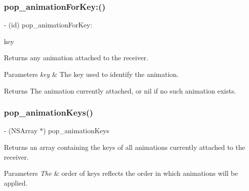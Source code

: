 \subsubsection{\texorpdfstring{pop\+\_\+animation\+For\+Key\+:()}{pop\_animationForKey:()}\hspace{0.1cm}{\footnotesize\ttfamily [3/3]}}
{\footnotesize\ttfamily -\/ (id) pop\+\_\+animation\+For\+Key\+: \begin{DoxyParamCaption}\item[{(N\+S\+String $\ast$)}]{key }\end{DoxyParamCaption}}

Returns any animation attached to the receiver. 
\begin{DoxyParams}{Parameters}
{\em key} & The key used to identify the animation. \\
\hline
\end{DoxyParams}
\begin{DoxyReturn}{Returns}
The animation currently attached, or nil if no such animation exists. 
\end{DoxyReturn}
\mbox{\label{category_n_s_object_07_p_o_p_08_a1651078990a6428516ef74bc0eed7480}} 
\subsubsection{\texorpdfstring{pop\+\_\+animation\+Keys()}{pop\_animationKeys()}\hspace{0.1cm}{\footnotesize\ttfamily [1/3]}}
{\footnotesize\ttfamily -\/ (N\+S\+Array $\ast$) pop\+\_\+animation\+Keys \begin{DoxyParamCaption}{ }\end{DoxyParamCaption}}

Returns an array containing the keys of all animations currently attached to the receiver. 
\begin{DoxyParams}{Parameters}
{\em The} & order of keys reflects the order in which animations will be applied. \\
\hline
\end{DoxyParams}
\mbox{\label{category_n_s_object_07_p_o_p_08_a1651078990a6428516ef74bc0eed7480}} 
